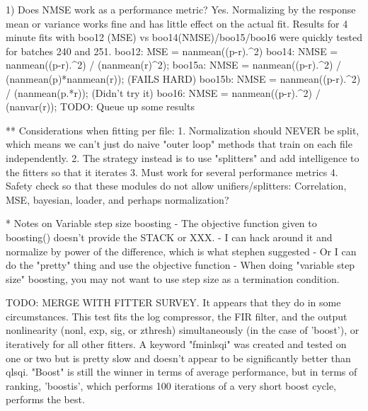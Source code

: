  1) Does NMSE work as a performance metric?
     Yes. Normalizing by the response mean or variance works fine and has little effect on the actual fit. 
     Results for 4 minute fits with boo12 (MSE) vs boo14(NMSE)/boo15/boo16 were quickly tested for batches 240 and 251. 
     boo12: MSE  = nanmean((p-r).^2)
     boo14: NMSE = nanmean((p-r).^2) / (nanmean(r)^2);
     boo15a: NMSE = nanmean((p-r).^2) / (nanmean(p)*nanmean(r));  (FAILS HARD)
     boo15b: NMSE = nanmean((p-r).^2) / (nanmean(p.*r));  (Didn't try it)
     boo16: NMSE = nanmean((p-r).^2) / (nanvar(r));
     TODO: Queue up some results

** Considerations when fitting per file:
   1. Normalization should NEVER be split, which means we can't just do naive "outer loop" methods that train on each file independently. 
   2. The strategy instead is to use "splitters" and add intelligence to the fitters so that it iterates 
   3. Must work for several performance metrics
   4. Safety check so that these modules do not allow unifiers/splitters: Correlation, MSE, bayesian, loader, and perhaps normalization?


* Notes on Variable step size boosting
  - The objective function given to boosting() doesn't provide the STACK or XXX.
    - I can hack around it and normalize by power of the difference, which is what stephen suggested
    - Or I can do the "pretty" thing and use the objective function
  - When doing "variable step size" boosting, you may not want to use step size as a termination condition.




TODO: MERGE WITH FITTER SURVEY. It appears that they do in some circumstances. This test fits the log compressor, the FIR filter, and the output nonlinearity (nonl, exp, sig, or zthresh) simultaneously (in the case of 'boost'), or iteratively for all other fitters. A keyword "fminlsqi" was created and tested on one or two but is pretty slow and doesn't appear to be significantly better than qlsqi. "Boost" is still the winner in terms of average performance, but in terms of ranking, 'boostis', which performs 100 iterations of a very short boost cycle, performs the best.




